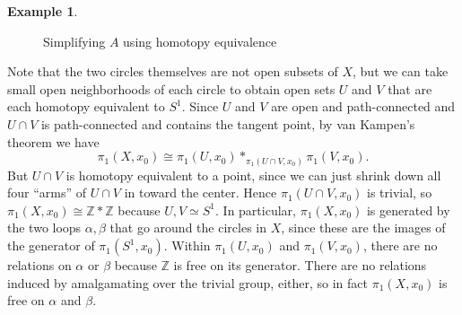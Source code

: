 \documentclass{article}
\theoremstyle{definition}
\newtheorem{exa}[thm]{Example}
\theoremstyle{remark}
\newcommand{\Z}{\mathbb Z}
\numberwithin{figure}{section}
\begin{document}
\begin{exa}
\begin{figure}[h]
		\caption{Simplifying $A$ using homotopy equivalence}
		\label{fig:homotope A}
	\end{figure}
	
	Note that the two circles themselves are not open subsets of $X$, but we can take small open neighborhoods of each circle to obtain open sets $U$ and $V$ that are each homotopy equivalent to $S^1$. Since $U$ and $V$ are open and path-connected and $U \cap V$ is path-connected and contains the tangent point, by van Kampen's theorem we have
	\[
	\pi_1(X, x_0) \cong \pi_1(U, x_0) *_{\pi_1(U \cap V, x_0)} \pi_1(V, x_0).
	\]
	But $U \cap V$ is homotopy equivalent to a point, since we can just shrink down all four ``arms'' of $U \cap V$ in toward the center. Hence $\pi_1(U \cap V, x_0)$ is trivial, so $\pi_1(X, x_0) \cong \Z * \Z$ because $U, V \simeq S^1$. In particular, $\pi_1(X, x_0)$ is generated by the two loops $\alpha, \beta$ that go around the circles in $X$, since these are the images of the generator of $\pi_1(S^1, x_0)$. Within $\pi_1(U, x_0)$ and $\pi_1(V, x_0)$, there are no relations on $\alpha$ or $\beta$ because $\Z$ is free on its generator. There are no relations induced by amalgamating over the trivial group, either, so in fact $\pi_1(X, x_0)$ is free on $\alpha$ and $\beta$.
	

\end{exa}
\end{document}
